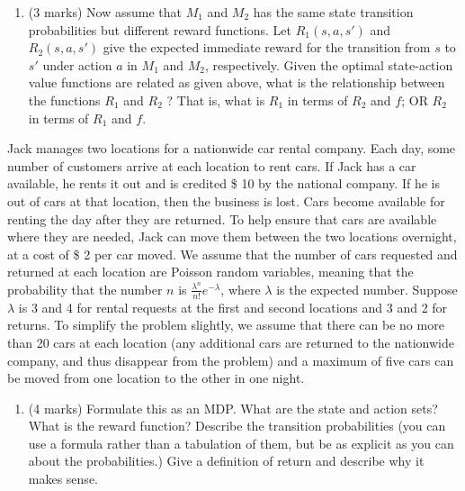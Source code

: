 \documentclass[addpoints,12pt,solution]{exam}
\begin{document}
\begin{questions}
\begin{enumerate}[label=(\alph*)]
\begin{solution}
\end{solution}

\item (3 marks) Now assume that $M_1$ and $M_2$ has the same state transition probabilities but different reward functions. Let $R_1(s, a, s')$ and $R_2(s, a, s')$ give the expected immediate reward for the transition from $s$ to $s'$ under action $a$ in $M_1$ and $M_2$, respectively. Given the optimal state-action value functions are related as given above, what is the relationship between the functions $R_1$ and $R_2$ ? That is, what is $R_1$ in terms of $R_2$ and $f$; OR $R_2$ in terms of $R_1$ and $f$.

\begin{solution}

\end{solution}

\end{enumerate}



 Jack manages two locations for a nationwide car rental company. Each day, some number of customers arrive at each location to rent cars. If Jack has a car available, he rents it out and is credited \$ 10 by the national company. If he is out of cars at that location, then the business is lost. Cars become available for renting the day after they are returned. To help ensure that cars are available where they are needed, Jack can move them between the two locations overnight, at a cost of \$ 2 per car moved. We assume that the number of cars requested and returned at each location are Poisson random variables, meaning that the probability that the number $n$ is $\frac{\lambda^n}{n!}e^{-\lambda}$, where $\lambda$ is the expected number. Suppose $\lambda$ is 3 and 4 for rental requests at the first and second locations and 3 and 2 for returns. To simplify the problem slightly, we assume that there can be no more than 20 cars at each location (any additional cars are returned to the nationwide company, and thus disappear from the problem) and a
maximum of five cars can be moved from one location to the other in one night.

\begin{enumerate}[label=(\alph*)]

\item (4 marks) Formulate this as an MDP. What are the state and action sets? What is the reward function? Describe the transition probabilities (you can use a formula rather than a tabulation of them, but be as explicit as you can about the probabilities.) Give a definition of return and describe why it makes sense.  


\end{enumerate}
\end{questions}
\end{document}
